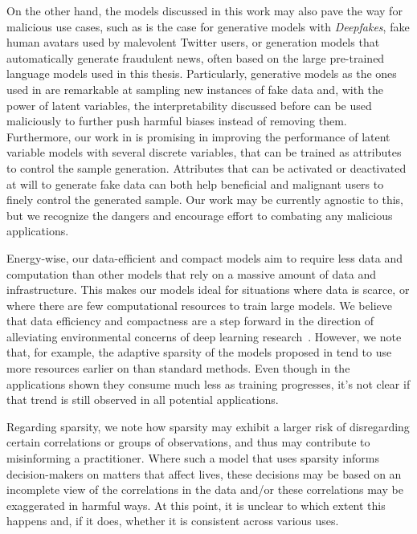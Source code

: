 On the other hand, the models discussed in this work may
also pave the way for malicious use cases, such as is the case for generative models with
\emph{Deepfakes}, fake human avatars used by malevolent Twitter
users, or generation models that automatically generate fraudulent news,
often based on the large pre-trained language models used in this thesis.
Particularly, generative models as the ones used in 
are remarkable at sampling new instances of fake data and, with the
power of latent variables, the interpretability discussed before can
be used maliciously to further push harmful biases instead of
removing them. Furthermore, our work in  is promising in improving the
performance of latent variable models with several discrete
variables, that can be trained as attributes to control the sample
generation. Attributes that can be activated or deactivated at will
to generate fake data can both help beneficial and malignant users to
finely control the generated sample. Our work may be currently
agnostic to this, but we recognize the dangers and encourage effort to
combating any malicious applications.

Energy-wise, our data-efficient and compact models aim to require
less data and computation than other models that rely on a massive
amount of data and infrastructure. This makes our models ideal for
situations where data is scarce, or where there are few computational
resources to train large models. We believe that data efficiency and
compactness are a step forward in the direction of alleviating
environmental concerns of deep learning
research~\citep{strubell2019energy}. However, we note that, for
example, the adaptive sparsity of the models proposed in
 tend to use more resources earlier on
than standard methods. Even though in the applications shown
they consume much less as training progresses, it's not clear if that
trend is still observed in all potential applications.

Regarding sparsity, we note how sparsity may exhibit a larger risk of
disregarding certain correlations or groups of observations,
and thus may contribute to misinforming a practitioner.
Where such a model that uses sparsity informs decision-makers on matters that affect
lives, these decisions may be based on an incomplete view of the
correlations in the data and/or these correlations may be exaggerated
in harmful ways.
At this point, it is
unclear to which extent this happens and, if it does, whether it is
consistent across various uses.

\cleardoublepage

\singlespacing
